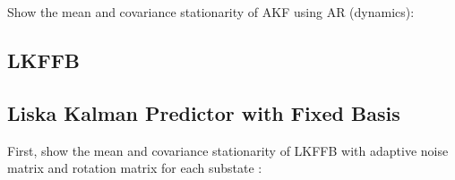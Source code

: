 Show the mean and covariance stationarity of AKF using AR (dynamics):

\subsection{LKFFB}

\subsection{Liska Kalman Predictor with Fixed Basis} \label{sec:ap_liska_deriv}

First, show the mean and covariance stationarity of LKFFB with adaptive noise matrix and rotation matrix for each substate :
\\
\\
